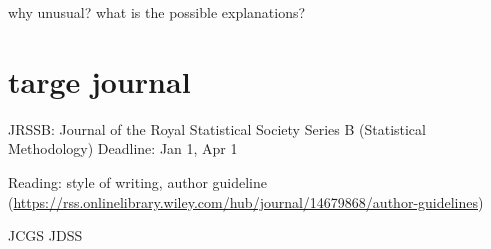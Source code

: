 \documentclass[]{interact}
\theoremstyle{plain}%
\theoremstyle{definition}
\theoremstyle{remark}
\begin{document}
why unusual? what is the possible explanations?

\hypertarget{targe-journal}{%
\section{targe journal}\label{targe-journal}}

JRSSB: Journal of the Royal Statistical Society Series B (Statistical
Methodology) Deadline: Jan 1, Apr 1

Reading: style of writing, author guideline
(\url{https://rss.onlinelibrary.wiley.com/hub/journal/14679868/author-guidelines})

JCGS JDSS

\newpage



\end{document}
